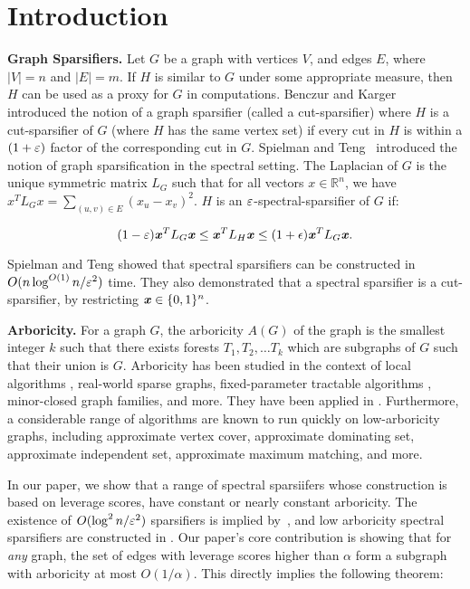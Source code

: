 \section{Introduction}

\textbf{Graph Sparsifiers.} 
Let $G$ be a graph with vertices $V$, and
edges $E$, where $|V| = n$ and $|E| = m$. If $H$ is similar to $G$ under
some appropriate measure, then $H$ can be used as a proxy for $G$ in
computations. Benczur and Karger~\cite{BK96} introduced the notion of a
graph sparsifier (called a cut-sparsifier) where $H$ is a cut-sparsifier
of $G$ (where $H$ has the same vertex set) if every cut in $H$ is within a $(1+\varepsilon)$
factor of the corresponding cut in $G$. 
Spielman and Teng~\cite{SpielmanT04} 
introduced the notion of graph sparsification in the spectral setting.
The Laplacian of $G$ is the unique symmetric matrix $L_G$ such that for
all vectors $x \in \mathbb{R}^n$, we have $x^T L_G x = \sum_{(u,v) \in
E} (x_u - x_v)^2$. $H$ is an $\varepsilon$-spectral-sparsifier of $G$ if:

\begin{equation}\label{1}
  (1-\varepsilon) \boldsymbol{\mathit{x}}^TL_G\boldsymbol{\mathit{x}} \leq \boldsymbol{\mathit{x}}^TL_H\boldsymbol{\mathit{x}} \leq (1+\epsilon)\boldsymbol{\mathit{x}}^TL_G\boldsymbol{\mathit{x}}.
\end{equation}

Spielman and Teng \cite{SpielmanT04} showed that spectral sparsifiers
can be constructed in $O(n \log^{O(1)} n / \varepsilon^2)$ time. They also
demonstrated that a spectral sparsifier is a cut-sparsifier, by
restricting $\boldsymbol{\mathit{x}} \in \{0, 1\}^n$. 

\textbf{Arboricity.} For a graph $G$, the arboricity $A(G)$ of the graph
is the smallest integer $k$ such that there exists forests $T_1, T_2,
\ldots T_k$ which are subgraphs of $G$ such that their union is $G$.
Arboricity has been studied in the context of local algorithms
, real-world sparse graphs, fixed-parameter
tractable algorithms , minor-closed graph families,
and more. They have been applied in .
Furthermore, a considerable range of algorithms are known to run quickly
on low-arboricity graphs, including approximate vertex cover,
approximate dominating set, approximate independent set, approximate
maximum matching, and more.

In our paper, we show that a range of spectral sparsiifers whose
construction is based on leverage scores, have constant
or nearly constant
arboricity. The existence of $O(\log^2 n / \varepsilon^2)$ sparsifiers is
implied by~\cite{KyngS18}, and low arboricity spectral sparsifiers are
constructed in . Our paper's core
contribution is showing that for \textit{any} graph, the set of edges
with leverage scores higher than $\alpha$ form a subgraph with
arboricity at most $O(1/ \alpha)$. This directly implies the following
theorem:

